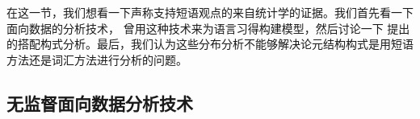 \begin{exe}
\begin{xlist}[iv.]
\begin{exe}
\begin{xlist}[iv.]
在这一节，我们想看一下声称支持短语观点的来自统计学的证据。我们首先看一下面向数据的分析技术， \citet{Bod2009a}曾用这种技术来为语言习得构建模型，然后讨论一下 \citet{SG2009a}提出的搭配构式分析。最后，我们认为这些分布分析不能够解决论元结构构式是用短语方法还是词汇方法进行分析的问题。

\subsection{无监督面向数据分析技术}
\label{Abschnitt-U-Dop-phrasal}


\end{xlist}
\end{exe}
\end{xlist}
\end{exe}
